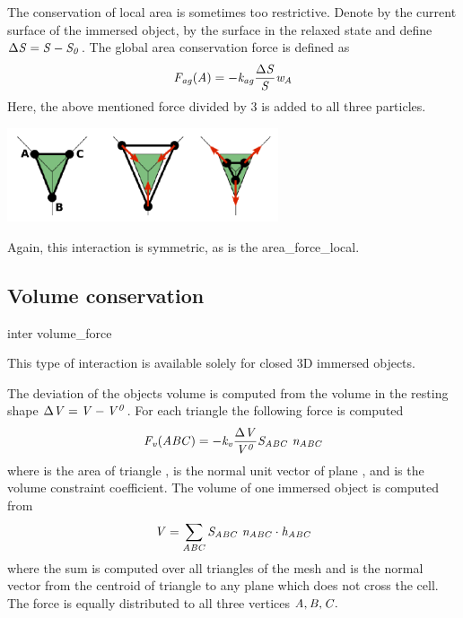The conservation of local area is sometimes too restrictive. Denote by  the 
current surface of the immersed object, by  the surface in the relaxed 
state and define $\Delta \var{S} = \var{S} - \var{S_0}$. The global area conservation 
force is defined as
\begin{equation}
\var{F_{ag}(A)} = - \var{k_{ag}}\frac{\Delta \var{S}}{\var{S}}\var{w_{A}}
\end{equation}
Here, the above mentioned force divided by 3 is added to all three particles.
\begin{center}
  \includegraphics[width=8cm]{figures/arealocal.png}
\end{center}
Again, this interaction is symmetric, as is the area\_{}force\_{}local.

\subsection{Volume conservation}

\begin{essyntax}
  inter 
  volume_force
   
\end{essyntax}
This type of interaction is available solely for closed 3D immersed objects.

The deviation of the objects volume  is computed from the volume in 
the resting shape $\Delta \var{V} = \var{V} - \var{V^0}$. For each triangle the following 
force is computed
\begin{equation}
\var{F_v(ABC)} = -\var{k_v}\frac{\Delta \var{V}}{\var{V^0}} \var{S_{ABC}}\ \var{n_{ABC}}
\end{equation}
where  is the area of triangle ,  is the normal unit 
vector of plane , and  is the volume constraint coefficient. The volume 
of one immersed object is computed from
\begin{equation}
\var{V} = \sum_{\var{ABC}}\var{S_{ABC}}\ \var{n_{ABC}}\cdot \var{h_{ABC}}
\end{equation}
where the sum is computed over all triangles of the mesh and  is the normal 
vector from the centroid of triangle  to any plane which does not cross the cell. 
The force  is equally distributed to all three vertices $\var{A},\var{B},
\var{C}.$

